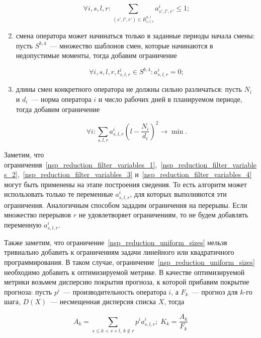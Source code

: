 \documentclass[times,specification,annotation]{itmo-student-thesis}
\begin{document}
\begin{enumerate}
    \begin{equation} \forall i, s, l, r : \sum\limits_{(s', l', r') \in R^{n, i}_{s, l, r}} a^i_{s', l', r'} \le 1; \label{nsp_reduction_rest_constraint}\end{equation}

    \item смена оператора может начинаться только в заданные периоды начала смены: пусть $S^{b, 4}$~--- множество шаблонов смен, которые начинаются в недопустимые моменты, тогда добавим ограничение

    \begin{equation} \forall i, s, l, r, t^i_{s, l, r} \in S^{b, 4} : a^i_{s, l, r} = 0; \label{nsp_reduction_filter_variables_4}\end{equation}

    \item длины смен конкретного оператора не должны сильно различаться: пусть $N_i$ и $d_i$~--- норма оператора $i$ и число рабочих дней в планируемом периоде, тогда добавим ограничение

    \begin{equation} \forall i : \sum\limits_{s, l, r} a^i_{s, l, r} \left( l - \frac{N_i}{d_i} \right)^2 \rightarrow \min. \label{nsp_reduction_uniform_sizes}\end{equation}
\end{enumerate}

Заметим, что ограничения~\eqref{nsp_reduction_filter_variables_1},~\eqref{nsp_reduction_filter_variables_2},~\eqref{nsp_reduction_filter_variables_3} и~\eqref{nsp_reduction_filter_variables_4} могут быть применены на этапе построения сведения.
То есть алгоритм может использовать только те переменные $a^i_{s, l, r}$, для которых выполняются эти ограничения.
Аналогичным способом зададим ограничения на перерывы.
Если множество перерывов $r$ не удовлетворяет ограничениям, то не будем добавлять переменную $a^i_{s, l, r}$.

Также заметим, что ограничение~\eqref{nsp_reduction_uniform_sizes} нельзя тривиально добавить к ограничениям задачи линейного или квадратичного программирования.
В таком случае, ограничение~\eqref{nsp_reduction_uniform_sizes} необходимо добавить к оптимизируемой метрике.
В качестве оптимизируемой метрики возьмем дисперсию покрытия прогноза, к которой прибавим покрытие прогноза: пусть $p^i$~--- производительность оператора $i$, а $F_k$~--- прогноз для $k$-го шага, $D(X)$~--- несмещенная дисперсия списка $X$, тогда

\begin{equation} A_k = \sum\limits_{s \le k < s + l,\, k \notin r} p^i a^i_{s, l, r}; \; K_k = \frac{A_k}{F_k} \end{equation}
\end{document}
